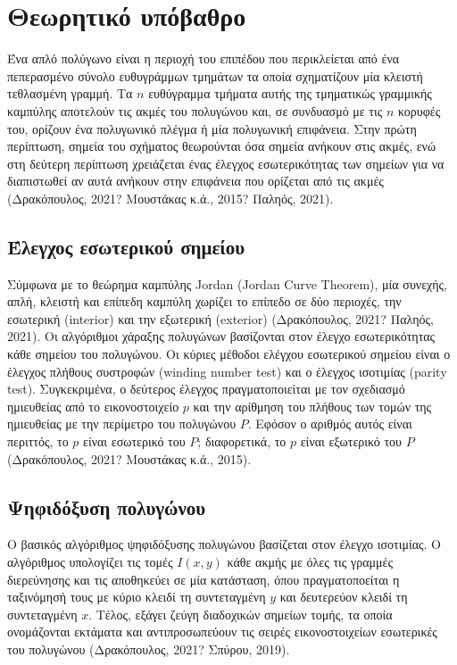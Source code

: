 \chapter{Θεωρητικό υπόβαθρο}

Ένα απλό πολύγωνο είναι η περιοχή του επιπέδου που περικλείεται από ένα πεπερασμένο σύνολο ευθυγράμμων τμημάτων τα οποία σχηματίζουν μία κλειστή τεθλασμένη γραμμή. Τα $n$ ευθύγραμμα τμήματα αυτής της τμηματικώς γραμμικής καμπύλης αποτελούν τις ακμές του πολυγώνου και, σε συνδυασμό με τις $n$ κορυφές του, ορίζουν ένα πολυγωνικό πλέγμα ή μία πολυγωνική επιφάνεια. Στην πρώτη περίπτωση, σημεία του σχήματος θεωρούνται όσα σημεία ανήκουν στις ακμές, ενώ στη δεύτερη περίπτωση χρειάζεται ένας έλεγχος εσωτερικότητας των σημείων για να διαπιστωθεί αν αυτά ανήκουν στην επιφάνεια που ορίζεται από τις ακμές (Δρακόπουλος, 2021? Μουστάκας κ.ά., 2015? Παληός, 2021).

\section{Έλεγχος εσωτερικού σημείου}
Σύμφωνα με το θεώρημα καμπύλης \textlatin{Jordan (Jordan Curve Theorem)}, μία συνεχής, απλή, κλειστή και επίπεδη καμπύλη χωρίζει το επίπεδο σε δύο περιοχές, την εσωτερική (\textlatin{interior}) και την εξωτερική (\textlatin{exterior}) (Δρακόπουλος, 2021? Παληός, 2021). Οι αλγόριθμοι χάραξης πολυγώνων βασίζονται στον έλεγχο εσωτερικότητας κάθε σημείου του πολυγώνου. Οι κύριες μέθοδοι ελέγχου εσωτερικού σημείου είναι ο έλεγχος πλήθους συστροφών (\textlatin{winding number test}) και ο έλεγχος ισοτιμίας (\textlatin{parity test}). Συγκεκριμένα, ο δεύτερος έλεγχος πραγματοποιείται με τον σχεδιασμό ημιευθείας από το εικονοστοιχείο $p$ και την αρίθμηση του πλήθους των τομών της ημιευθείας με την περίμετρο του πολυγώνου $P$. Εφόσον ο αριθμός αυτός είναι περιττός, το $p$ είναι εσωτερικό του $P$; διαφορετικά, το $p$ είναι εξωτερικό του $P$ (Δρακόπουλος, 2021? Μουστάκας κ.ά., 2015).

\section{Ψηφιδόξυση πολυγώνου}
Ο βασικός αλγόριθμος ψηφιδόξυσης πολυγώνου βασίζεται στον έλεγχο ισοτιμίας. Ο αλγόριθμος υπολογίζει τις τομές $I(x, y)$ κάθε ακμής με όλες τις γραμμές διερεύνησης και τις αποθηκεύει σε μία κατάσταση, όπου πραγματοποείται η ταξινόμησή τους με κύριο κλειδί τη συντεταγμένη $y$ και δευτερεύον κλειδί τη συντεταγμένη $x$. Τέλος, εξάγει ζεύγη διαδοχικών σημείων τομής, τα οποία ονομάζονται εκτάματα και αντιπροσωπεύουν τις σειρές εικονοστοιχείων εσωτερικές του πολυγώνου (Δρακόπουλος, 2021? Σπύρου, 2019). \par

